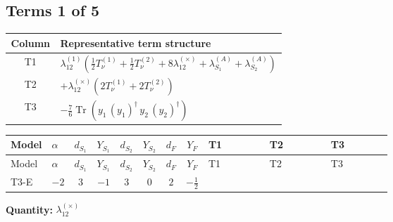 \documentclass[8pt]{article}
\begin{document}
\begin{landscape}
\subsection*{Terms 1 of 5}
\begin{center}
\begin{tabular}{@{}c >{\raggedright\arraybackslash}p{0.82\linewidth}@{}}
\toprule
Column & Representative term structure \\
\midrule
T1 & \(\displaystyle {\lambda_{12}^{(1)}} \left(\frac{1}{2} T_{\nu}^{(1)}+\frac{1}{2} T_{\nu}^{(2)}+8 {\lambda_{12}^{(\times)}}+{\lambda_{S_1}^{(A)}}+{\lambda_{S_2}^{(A)}}\right)\) \\
\midrule
T2 & \(\displaystyle +{\lambda_{12}^{(\times)}} (2 T_{\nu}^{(1)}+2 T_{\nu}^{(2)})\) \\
\midrule
T3 & \(\displaystyle -\frac{7}{6} \operatorname{Tr}\!\left({y_1}\,\left({y_1}\right)^{\dagger}\,{y_2}\,\left({y_2}\right)^{\dagger}\right)\) \\
\midrule
\bottomrule
\end{tabular}
\end{center}
\smallskip
\tiny
\begin{longtable}{@{}llcccccc >{\raggedright\arraybackslash}p{0.21\linewidth} >{\raggedright\arraybackslash}p{0.21\linewidth} >{\raggedright\arraybackslash}p{0.21\linewidth}@{}}
\toprule
Model & $\alpha$ & $d_{S_1}$ & $Y_{S_1}$ & $d_{S_2}$ & $Y_{S_2}$ & $d_F$ & $Y_F$ & T1 & T2 & T3 \\
\midrule
\endfirsthead
\toprule
Model & $\alpha$ & $d_{S_1}$ & $Y_{S_1}$ & $d_{S_2}$ & $Y_{S_2}$ & $d_F$ & $Y_F$ & T1 & T2 & T3 \\
\midrule
\endhead
T3-E & $-2$ & $3$ & $-1$ & $3$ & $0$ & $2$ & $-\frac{1}{2}$ & \scriptsize\adjustbox{max width=\linewidth}{$\begin{gathered} {\lambda_{12}^{(1)}} \left(\frac{1}{2} T_{\nu}^{(1)}+\frac{1}{2} T_{\nu}^{(2)}+8 {\lambda_{12}^{(\times)}}+{\lambda_{S_1}^{(A)}}+{\lambda_{S_2}^{(A)}}\right)\end{gathered}$} & \scriptsize\adjustbox{max width=\linewidth}{$\begin{gathered} +{\lambda_{12}^{(\times)}} (2 T_{\nu}^{(1)}+2 T_{\nu}^{(2)})\end{gathered}$} & \scriptsize\adjustbox{max width=\linewidth}{$\begin{gathered} -\frac{7}{6} \operatorname{Tr}\!\left({y_1}\,\left({y_1}\right)^{\dagger}\,{y_2}\,\left({y_2}\right)^{\dagger}\right)\end{gathered}$} \\
\midrule
\bottomrule
\end{longtable}
\clearpage
\noindent\textbf{Quantity: }$\lambda_{12}^{(\times)}$\par\smallskip

\end{landscape}
\end{document}
